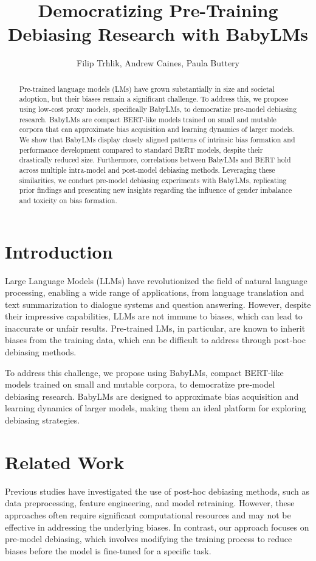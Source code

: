 \documentclass{article}
\begin{document}
\title{Democratizing Pre-Training Debiasing Research with BabyLMs}

\author{Filip Trhlik, Andrew Caines, Paula Buttery}

\maketitle

\begin{abstract}
Pre-trained language models (LMs) have grown substantially in size and societal adoption, but their biases remain a significant challenge. To address this, we propose using low-cost proxy models, specifically BabyLMs, to democratize pre-model debiasing research. BabyLMs are compact BERT-like models trained on small and mutable corpora that can approximate bias acquisition and learning dynamics of larger models. We show that BabyLMs display closely aligned patterns of intrinsic bias formation and performance development compared to standard BERT models, despite their drastically reduced size. Furthermore, correlations between BabyLMs and BERT hold across multiple intra-model and post-model debiasing methods. Leveraging these similarities, we conduct pre-model debiasing experiments with BabyLMs, replicating prior findings and presenting new insights regarding the influence of gender imbalance and toxicity on bias formation.
\end{abstract}

\section{Introduction}
Large Language Models (LLMs) have revolutionized the field of natural language processing, enabling a wide range of applications, from language translation and text summarization to dialogue systems and question answering. However, despite their impressive capabilities, LLMs are not immune to biases, which can lead to inaccurate or unfair results. Pre-trained LMs, in particular, are known to inherit biases from the training data, which can be difficult to address through post-hoc debiasing methods.

To address this challenge, we propose using BabyLMs, compact BERT-like models trained on small and mutable corpora, to democratize pre-model debiasing research. BabyLMs are designed to approximate bias acquisition and learning dynamics of larger models, making them an ideal platform for exploring debiasing strategies.

\section{Related Work}
Previous studies have investigated the use of post-hoc debiasing methods, such as data preprocessing, feature engineering, and model retraining. However, these approaches often require significant computational resources and may not be effective in addressing the underlying biases. In contrast, our approach focuses on pre-model debiasing, which involves modifying the training process to reduce biases before the model is fine-tuned for a specific task.
\end{document}
